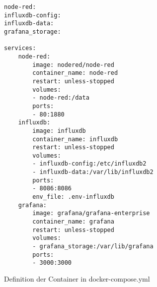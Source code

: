 \begin{listing}[!ht]
\begin{verbatim}
node-red:
influxdb-config:
influxdb-data:
grafana_storage:

services:
    node-red:
        image: nodered/node-red
        container_name: node-red
        restart: unless-stopped
        volumes:
        - node-red:/data
        ports:
        - 80:1880
    influxdb:
        image: influxdb
        container_name: influxdb
        restart: unless-stopped
        volumes:
        - influxdb-config:/etc/influxdb2
        - influxdb-data:/var/lib/influxdb2
        ports:
        - 8086:8086
        env_file: .env-influxdb
    grafana:
        image: grafana/grafana-enterprise
        container_name: grafana
        restart: unless-stopped
        volumes:
        - grafana_storage:/var/lib/grafana
        ports:
        - 3000:3000
\end{verbatim}
\caption{Definition der Container in docker-compose.yml}
\label{list:docker}
\end{listing}  